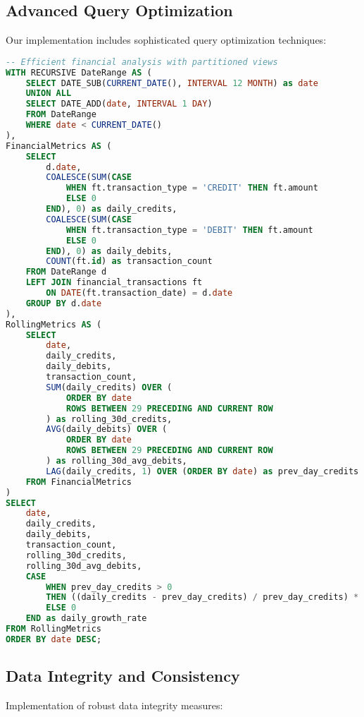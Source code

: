 \documentclass[conference]{IEEEtran}
\begin{document}
\subsection{Advanced Query Optimization}
Our implementation includes sophisticated query optimization techniques:

\begin{lstlisting}[language=SQL, caption=Optimized Financial Analytics Queries]
-- Efficient financial analysis with partitioned views
WITH RECURSIVE DateRange AS (
    SELECT DATE_SUB(CURRENT_DATE(), INTERVAL 12 MONTH) as date
    UNION ALL
    SELECT DATE_ADD(date, INTERVAL 1 DAY)
    FROM DateRange
    WHERE date < CURRENT_DATE()
),
FinancialMetrics AS (
    SELECT 
        d.date,
        COALESCE(SUM(CASE 
            WHEN ft.transaction_type = 'CREDIT' THEN ft.amount 
            ELSE 0 
        END), 0) as daily_credits,
        COALESCE(SUM(CASE 
            WHEN ft.transaction_type = 'DEBIT' THEN ft.amount 
            ELSE 0 
        END), 0) as daily_debits,
        COUNT(ft.id) as transaction_count
    FROM DateRange d
    LEFT JOIN financial_transactions ft 
        ON DATE(ft.transaction_date) = d.date
    GROUP BY d.date
),
RollingMetrics AS (
    SELECT 
        date,
        daily_credits,
        daily_debits,
        transaction_count,
        SUM(daily_credits) OVER (
            ORDER BY date 
            ROWS BETWEEN 29 PRECEDING AND CURRENT ROW
        ) as rolling_30d_credits,
        AVG(daily_debits) OVER (
            ORDER BY date 
            ROWS BETWEEN 29 PRECEDING AND CURRENT ROW
        ) as rolling_30d_avg_debits,
        LAG(daily_credits, 1) OVER (ORDER BY date) as prev_day_credits
    FROM FinancialMetrics
)
SELECT 
    date,
    daily_credits,
    daily_debits,
    transaction_count,
    rolling_30d_credits,
    rolling_30d_avg_debits,
    CASE 
        WHEN prev_day_credits > 0 
        THEN ((daily_credits - prev_day_credits) / prev_day_credits) * 100 
        ELSE 0 
    END as daily_growth_rate
FROM RollingMetrics
ORDER BY date DESC;
\end{lstlisting}

\subsection{Data Integrity and Consistency}
Implementation of robust data integrity measures:
\end{document}
